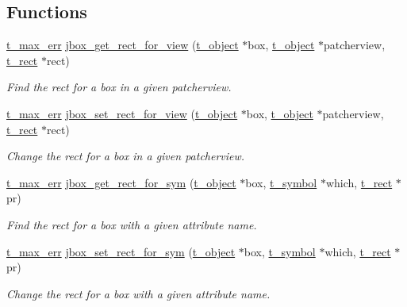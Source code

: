 \subsection*{Functions}
\begin{DoxyCompactItemize}
\item 
\hyperlink{group__datatypes_ga73edaae82b318855cc09fac994918165}{t\_\-max\_\-err} \hyperlink{group__jbox_gab47a7fa918c470f60f0789baafaa7b4b}{jbox\_\-get\_\-rect\_\-for\_\-view} (\hyperlink{structt__object}{t\_\-object} $\ast$box, \hyperlink{structt__object}{t\_\-object} $\ast$patcherview, \hyperlink{structt__rect}{t\_\-rect} $\ast$rect)
\begin{DoxyCompactList}\small\item\em Find the rect for a box in a given patcherview. \item\end{DoxyCompactList}\item 
\hyperlink{group__datatypes_ga73edaae82b318855cc09fac994918165}{t\_\-max\_\-err} \hyperlink{group__jbox_ga2e9cb5c8f8c731dc7af4d4f78ddbd387}{jbox\_\-set\_\-rect\_\-for\_\-view} (\hyperlink{structt__object}{t\_\-object} $\ast$box, \hyperlink{structt__object}{t\_\-object} $\ast$patcherview, \hyperlink{structt__rect}{t\_\-rect} $\ast$rect)
\begin{DoxyCompactList}\small\item\em Change the rect for a box in a given patcherview. \item\end{DoxyCompactList}\item 
\hyperlink{group__datatypes_ga73edaae82b318855cc09fac994918165}{t\_\-max\_\-err} \hyperlink{group__jbox_ga92dedcbda2a2dbbab47e0801902c56b4}{jbox\_\-get\_\-rect\_\-for\_\-sym} (\hyperlink{structt__object}{t\_\-object} $\ast$box, \hyperlink{structt__symbol}{t\_\-symbol} $\ast$which, \hyperlink{structt__rect}{t\_\-rect} $\ast$pr)
\begin{DoxyCompactList}\small\item\em Find the rect for a box with a given attribute name. \item\end{DoxyCompactList}\item 
\hyperlink{group__datatypes_ga73edaae82b318855cc09fac994918165}{t\_\-max\_\-err} \hyperlink{group__jbox_ga780de0c06bc1630cd0725174b21357f6}{jbox\_\-set\_\-rect\_\-for\_\-sym} (\hyperlink{structt__object}{t\_\-object} $\ast$box, \hyperlink{structt__symbol}{t\_\-symbol} $\ast$which, \hyperlink{structt__rect}{t\_\-rect} $\ast$pr)
\begin{DoxyCompactList}\small\item\em Change the rect for a box with a given attribute name. \item\end{DoxyCompactList}\item 

\end{DoxyCompactItemize}
